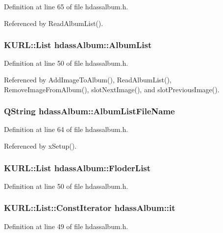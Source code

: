Definition at line 65 of file hdassalbum.h.

Referenced by Read\-Album\-List().
\subsubsection{\setlength{\rightskip}{0pt plus 5cm}KURL::List {\bf hdass\-Album::Album\-List}}\label{classhdassAlbum_ImageDetialo1}




Definition at line 50 of file hdassalbum.h.

Referenced by Add\-Image\-To\-Album(), Read\-Album\-List(), Remove\-Image\-From\-Album(), slot\-Next\-Image(), and slot\-Previous\-Image().
\subsubsection{\setlength{\rightskip}{0pt plus 5cm}QString {\bf hdass\-Album::Album\-List\-File\-Name}\hspace{0.3cm}{\tt  [private]}}\label{classhdassAlbum_hdassAlbumr1}




Definition at line 64 of file hdassalbum.h.

Referenced by x\-Setup().
\subsubsection{\setlength{\rightskip}{0pt plus 5cm}KURL::List {\bf hdass\-Album::Floder\-List}}\label{classhdassAlbum_ImageDetialo2}




Definition at line 50 of file hdassalbum.h.
\subsubsection{\setlength{\rightskip}{0pt plus 5cm}KURL::List::Const\-Iterator {\bf hdass\-Album::it}}\label{classhdassAlbum_ImageDetialo0}




Definition at line 49 of file hdassalbum.h.

